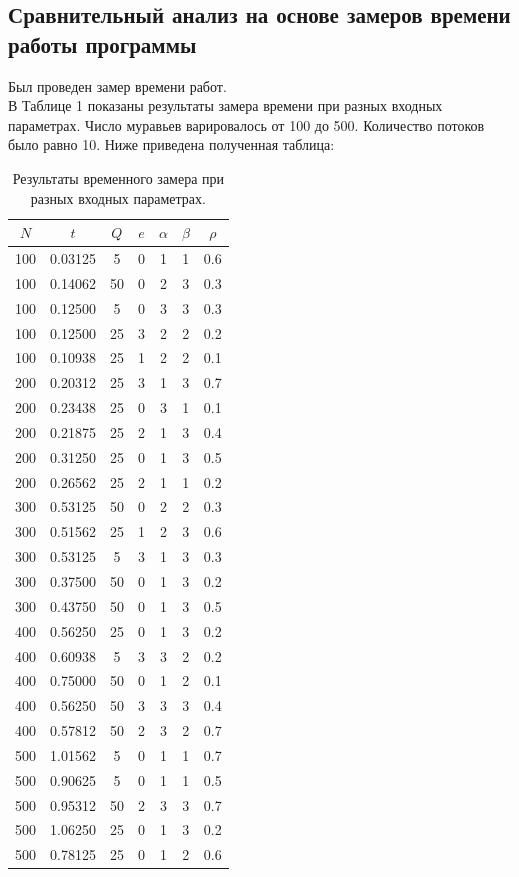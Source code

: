 \documentclass[a4paper, 12pt]{article}
\begin{document}
	\subsection{Сравнительный анализ на основе замеров времени работы программы}
	Был проведен замер времени работ.
	\\ \hspace*{5mm} В Таблице 1 показаны результаты замера времени при разных входных параметрах. Число муравьев варировалось от 100 до 500. Количество потоков было равно 10. Ниже приведена полученная таблица:
	\clearpage
	\newpage
	\begin{table}[h]
		\centering
		\caption{Результаты временного замера при разных входных параметрах.\\}
		\begin{tabular}{ | c | c | c | c | c | c | c |}
			\hline
			$N$ & $t$ & $Q$ & $e$ & $\alpha$ & $\beta$ & $\rho$  \\ \hline
			100 & 0.03125 & 5 & 0 & 1 & 1 & 0.6 \\ \hline
			100 & 0.14062 & 50 & 0 & 2 & 3 & 0.3 \\ \hline
			100 & 0.12500 & 5 & 0 & 3 & 3 & 0.3 \\ \hline
			100 & 0.12500 & 25 & 3 & 2 & 2 & 0.2 \\ \hline
			100 & 0.10938 & 25 & 1 & 2 & 2 & 0.1 \\ \hline
			200 & 0.20312 & 25 & 3 & 1 & 3 & 0.7 \\ \hline
			200 & 0.23438 & 25 & 0 & 3 & 1 & 0.1 \\ \hline
			200 & 0.21875 & 25 & 2 & 1 & 3 & 0.4 \\ \hline
			200 & 0.31250 & 25 & 0 & 1 & 3 & 0.5 \\ \hline
			200 & 0.26562 & 25 & 2 & 1 & 1 & 0.2 \\ \hline
			300 & 0.53125 & 50 & 0 & 2 & 2 & 0.3 \\ \hline
			300 & 0.51562 & 25 & 1 & 2 & 3 & 0.6 \\ \hline
			300 & 0.53125 & 5 & 3 & 1 & 3 & 0.3 \\ \hline
			300 & 0.37500 & 50 & 0 & 1 & 3 & 0.2 \\ \hline
			300 & 0.43750 & 50 & 0 & 1 & 3 & 0.5 \\ \hline
			400 & 0.56250 & 25 & 0 & 1 & 3 & 0.2 \\ \hline
			400 & 0.60938 & 5 & 3 & 3 & 2 & 0.2 \\ \hline
			400 & 0.75000 & 50 & 0 & 1 & 2 & 0.1 \\ \hline
			400 & 0.56250 & 50 & 3 & 3 & 3 & 0.4 \\ \hline
			400 & 0.57812 & 50 & 2 & 3 & 2 & 0.7 \\ \hline
			500 & 1.01562 & 5 & 0 & 1 & 1 & 0.7 \\ \hline
			500 & 0.90625 & 5 & 0 & 1 & 1 & 0.5 \\ \hline
			500 & 0.95312 & 50 & 2 & 3 & 3 & 0.7 \\ \hline
			500 & 1.06250 & 25 & 0 & 1 & 3 & 0.2 \\ \hline
			500 & 0.78125 & 25 & 0 & 1 & 2 & 0.6 \\ \hline
			
		\end{tabular}
	\end{table}
\end{document}
